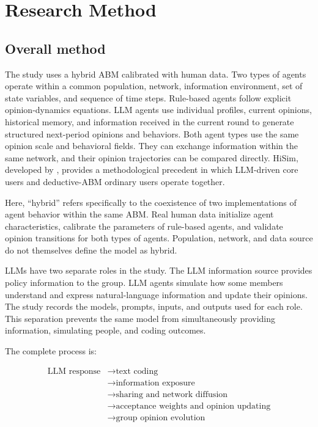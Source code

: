 \documentclass[11pt,a4paper]{article}
\begin{document}
\clearpage
\section{Research Method}

\subsection{Overall method}

The study uses a hybrid ABM calibrated with human data. Two types of agents operate within a common population, network, information environment, set of state variables, and sequence of time steps. Rule-based agents follow explicit opinion-dynamics equations. LLM agents use individual profiles, current opinions, historical memory, and information received in the current round to generate structured next-period opinions and behaviors. Both agent types use the same opinion scale and behavioral fields. They can exchange information within the same network, and their opinion trajectories can be compared directly. HiSim, developed by \citet{mou2024}, provides a methodological precedent in which LLM-driven core users and deductive-ABM ordinary users operate together.

Here, ``hybrid'' refers specifically to the coexistence of two implementations of agent behavior within the same ABM. Real human data initialize agent characteristics, calibrate the parameters of rule-based agents, and validate opinion transitions for both types of agents. Population, network, and data source do not themselves define the model as hybrid.

LLMs have two separate roles in the study. The LLM information source provides policy information to the group. LLM agents simulate how some members understand and express natural-language information and update their opinions. The study records the models, prompts, inputs, and outputs used for each role. This separation prevents the same model from simultaneously providing information, simulating people, and coding outcomes.

The complete process is:

\begin{equation*}
\begin{aligned}\text{LLM response} &\rightarrow \text{text coding} \\
&\rightarrow \text{information exposure} \\
&\rightarrow \text{sharing and network diffusion} \\
&\rightarrow \text{acceptance weights and opinion updating} \\
&\rightarrow \text{group opinion evolution}\end{aligned}
\end{equation*}
\end{document}
